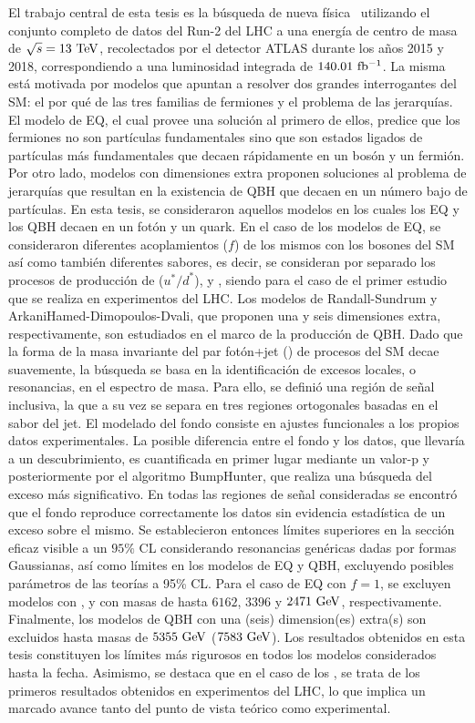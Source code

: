 El trabajo central de esta tesis es la búsqueda de nueva física~\cite{ATLAS-PhotonJetResonances-Run2-NOTE} utilizando el conjunto completo de datos del Run-2 del \ac{LHC} a una energía de centro de masa de \(\sqs = 13~\TeV\), recolectados por el detector \ac{ATLAS} durante los años 2015 y 2018, correspondiendo a una luminosidad integrada de \(140.01~\ifb\). La misma está motivada por modelos que apuntan a resolver dos grandes interrogantes del \ac{SM}: el por qué de las tres familias de fermiones y el problema de las jerarquías. El modelo de \acf{EQ}, el cual provee una solución al primero de ellos, predice que los fermiones no son partículas fundamentales sino que son estados ligados de partículas más fundamentales que decaen rápidamente en un bosón y un fermión. Por otro lado, modelos con dimensiones extra proponen soluciones al problema de jerarquías que resultan en la existencia de \acf{QBH} que decaen en un número bajo de partículas. En esta tesis, se consideraron aquellos modelos en los cuales los \ac{EQ} y los \ac{QBH} decaen en un fotón y un quark. En el caso de los modelos de \ac{EQ}, se consideraron diferentes acoplamientos (\(f\)) de los mismos con los bosones del \ac{SM} así como también diferentes sabores, es decir, se consideran por separado los procesos de producción de \qstar (\(u^*/d^*\)), \cstar y \bstar, siendo para el caso de \cstar el primer estudio que se realiza en experimentos del \ac{LHC}. Los modelos de Randall-Sundrum y ArkaniHamed-Dimopoulos-Dvali, que proponen una y seis dimensiones extra, respectivamente, son estudiados en el marco de la producción de \ac{QBH}. Dado que la forma de la masa invariante del par fotón+jet (\myj) de procesos del \ac{SM} decae suavemente, la búsqueda se basa en la identificación de excesos locales, o resonancias, en el espectro de masa. Para ello, se definió una región de señal inclusiva, la que a su vez se separa en tres regiones ortogonales basadas en el sabor del jet. El modelado del fondo consiste en ajustes funcionales a los propios datos experimentales. La posible diferencia entre el fondo y los datos, que llevaría a un descubrimiento, es cuantificada en primer lugar mediante un valor-p y posteriormente por el algoritmo BumpHunter, que realiza una búsqueda del exceso más significativo. En todas las regiones de señal consideradas se encontró que el fondo reproduce correctamente los datos sin evidencia estadística de un exceso sobre el mismo. Se establecieron entonces límites superiores en la sección eficaz visible a un \(95\%\) \ac{CL} considerando resonancias genéricas dadas por formas Gaussianas, así como límites en los modelos de \ac{EQ} y \ac{QBH}, excluyendo posibles parámetros de las teorías a 95\% \ac{CL}. Para el caso de \ac{EQ} con \(f = 1\), se excluyen modelos con \qstar, \cstar y \bstar con masas de hasta \(6162\), \(3396\) y \(2471~\GeV\), respectivamente. Finalmente, los modelos de \ac{QBH} con una (seis) dimension(es) extra(s) son excluidos hasta masas de \(5355~\GeV\) (\(7583~\GeV\)). Los resultados obtenidos en esta tesis constituyen los límites más rigurosos en todos los modelos considerados hasta la fecha. Asimismo, se destaca que en el caso de los \cstar, se trata de los primeros resultados obtenidos en experimentos del \ac{LHC}, lo que implica un marcado avance tanto del punto de vista teórico como experimental.